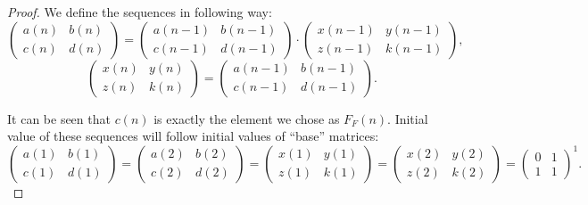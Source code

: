 \documentclass[12pt]{article}
\theoremstyle{definition}
\begin{document}
\begin{proof}
    We define the sequences in following way:
    $$
    \begin{pmatrix}
        a(n) & b(n)\\ 
        c(n) & d(n)
    \end{pmatrix} =
    \begin{pmatrix}
        a(n-1) & b(n-1)\\ 
        c(n-1) & d(n-1)
    \end{pmatrix}
    \cdot
    \begin{pmatrix}
        x(n-1) & y(n-1)\\ 
        z(n-1) & k(n-1)
    \end{pmatrix},
    $$
    $$
    \begin{pmatrix}
        x(n) & y(n)\\ 
        z(n) & k(n)
    \end{pmatrix} =
    \begin{pmatrix}
        a(n-1) & b(n-1)\\ 
        c(n-1) & d(n-1)
    \end{pmatrix}.
    $$

    It can be seen that $c(n)$ is exactly the element we chose as $F_F(n)$.
    Initial value of these sequences will follow initial values of ``base'' matrices:
    $$
    \begin{pmatrix}
        a(1) & b(1)\\ 
        c(1) & d(1)
    \end{pmatrix} =
    \begin{pmatrix}
        a(2) & b(2)\\ 
        c(2) & d(2)
    \end{pmatrix} =
    \begin{pmatrix}
        x(1) & y(1)\\ 
        z(1) & k(1)
    \end{pmatrix} =
    \begin{pmatrix}
        x(2) & y(2)\\ 
        z(2) & k(2)
    \end{pmatrix} =
    \begin{pmatrix}
        0 & 1\\ 
        1 & 1
    \end{pmatrix}^1.
    $$


\end{proof}
\end{document}
